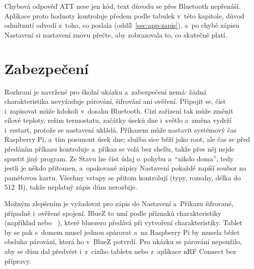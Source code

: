 Chybová odpověď ATT nese jen kód, text důvodu se přes Bluetooth nepřenáší. Aplikace proto
hodnoty kontroluje předem podle tabulek v~této kapitole, důvod odmítnutí odvodí z~toho, co
poslala (oddíl~\ref{sec:app-zapis}), a~po chybě zápisu Nastavení si nastavení znovu přečte, aby
zobrazovala to, co skutečně platí.

\section{Zabezpečení}
\label{sec:zabezpeceni}

Rozhraní je navržené pro školní ukázku a~zabezpečení nemá: žádná charakteristika nevyžaduje
párování, šifrování ani ověření. Připojit se, číst i~zapisovat může kdokoli v~dosahu Bluetooth.
Cizí zařízení tak může změnit cílové teploty, režim termostatu, začátky úseků dne i~světlo
a~změna vydrží i~restart, protože se nastavení ukládá. Příkazem  může nastavit systémový
čas Raspberry Pi, a~tím posunout úsek dne; služba sice běží jako root, ale čas se před předáním
příkazu  kontroluje a~příkaz se volá bez shellu, takže přes něj nejde spustit jiný
program. Ze Stavu lze číst údaj o~pohybu a~\enquote{nikdo doma}, tedy jestli je někdo přítomen,
a~opakované zápisy Nastavení pokaždé zapíší soubor na paměťovou kartu. Všechny vstupy se přitom
kontrolují (typy, rozsahy, délka do 512~B), takže neplatný zápis dům nerozbije.

Možným zlepšením je vyžadovat pro zápis do Nastavení a~Příkazu šifrované, případně i~ověřené
spojení. BlueZ to umí podle příznaků charakteristiky (například  nebo
~\cite{bluez-gatt}), které bluezero předává při vytvoření
charakteristiky. Tablet by se pak s~domem musel jednou spárovat a~na Raspberry Pi by musela
běžet obsluha párování, která ho v~BlueZ potvrdí. Pro ukázku se párování nepoužilo, aby se dům
dal předvést i~z~cizího tabletu nebo z~aplikace nRF Connect bez přípravy.
